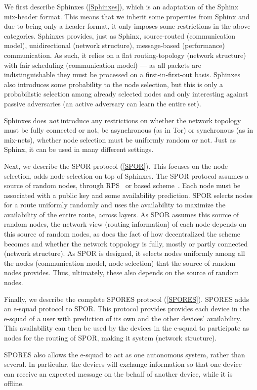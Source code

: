 We first describe Sphinxes (\cref{Sphinxes}), which is an adaptation of the 
Sphinx~\cite{Sphinx} mix-header format.
This means that we inherit some properties from Sphinx and due to being only a 
header format, it only imposes some restrictions in the above categories.
Sphinxes provides, just as Sphinx, source-routed (communication model), 
unidirectional (network structure), message-based (performance) communication.
As such, it relies on a flat routing-topology (network structure) with fair 
scheduling (communication model) --- as all packets are indistinguishable they 
must be processed on a first-in-first-out basis.
Sphinxes also introduces some probability to the node selection, but this is 
only a probabilistic selection among already selected nodes and only 
interesting against passive adversaries (an active adversary can learn the 
entire set).

Sphinxes does \emph{not} introduce any restrictions on whether the network 
topology must be fully connected or not, be asynchronous (as in Tor) or 
synchronous (as in mix-nets), whether node selection must be uniformly random 
or not.
Just as Sphinx, it can be used in many different settings.

Next, we describe the \ac{SPOR} protocol (\cref{SPOR}).
This focuses on the node selection, \ie adds node selection on top of Sphinxes.
The \ac{SPOR} protocol assumes a source of random nodes, \eg through 
\ac{RPS}~\cite[\eg][]{} or  based scheme~\cite[\eg][]{}.
Each node must be associated with a public key and some availability 
prediction.
\Ac{SPOR} selects nodes for a route uniformly randomly and uses the 
availability to maximize the availability of the entire route, \ie across 
layers.
As \ac{SPOR} assumes this source of random nodes, the network view (routing 
information) of each node depends on this source of random nodes, as does the 
fact of how decentralized the scheme becomes and whether the network toppology 
is fully, mostly or partly connected (network structure).
As \ac{SPOR} is designed, it selects nodes uniformly among all the nodes 
(communication model, node selection) that the source of random nodes provides.
Thus, ultimately, these also depends on the source of random nodes.

Finally, we describe the complete \ac{SPORES} protocol (\cref{SPORES}).
\Ac{SPORES} adds an e-squad protocol to \ac{SPOR}.
This protocol provides provides each device in the e-squad of a user with 
prediction of its own and the other devices' availability.
This availability can then be used by the devices in the e-squad to participate 
as nodes for the routing of \ac{SPOR}, \ie making it  system (network 
structure).

\Ac{SPORES} also allows the e-squad to act as one autonomous system, rather 
than several.
In particular, the devices will exchange information so that one device can 
receive an expected message on the behalf of another device, \eg while it is 
offline.





